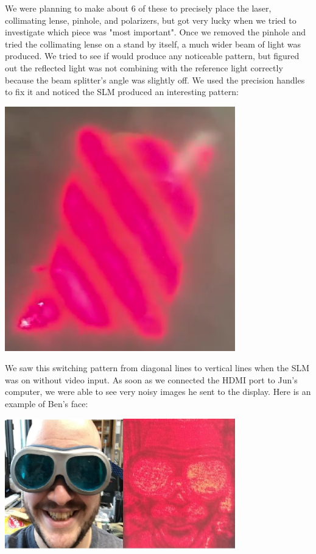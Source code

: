 \documentclass[12pt]{article}
\begin{document}
We were planning to make about 6 of these to precisely place the laser, collimating lense, pinhole, and polarizers, but got very lucky when we tried to investigate which piece was "most important". Once we removed the pinhole and tried the collimating lense on a stand by itself, a much wider beam of light was produced. We tried to see if would produce any noticeable pattern, but figured out the reflected light was not combining with the reference light correctly because the beam splitter's angle was slightly off. We used the precision handles to fix it and noticed the SLM produced an interesting pattern:

\begin{center}
\includegraphics[width=100mm]{initHologram.png}
\end{center}

We saw this switching pattern from diagonal lines to vertical lines when the SLM was on without video input. As soon as we connected the HDMI port to Jun's computer, we were able to see very noisy images he sent to the display. Here is an example of Ben's face:

\begin{center}
\includegraphics[width=100mm]{noisy_hologram.jpg}
\end{center}
\end{document}
